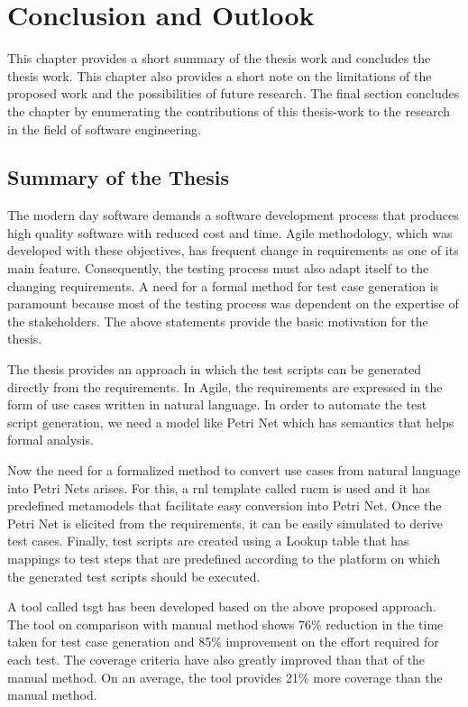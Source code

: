 
\chapter{Conclusion and Outlook}\label{conclusion} 
This chapter provides a short summary of the thesis work and concludes the thesis work. This chapter also provides a short note on the limitations of the proposed work and the possibilities of future research. The final section concludes the chapter by enumerating the contributions of this thesis-work to the research in the field of software engineering.

\section{Summary of the Thesis}
The modern day software demands a software development process that produces high quality software with reduced cost and time.  Agile methodology, which was developed with these objectives, has frequent change in requirements as one of its main feature. Consequently, the testing process must also adapt itself to the changing requirements. A need for a formal method for test case generation is paramount because most of the testing process was dependent on the expertise of the stakeholders. The above statements provide the basic motivation for the thesis.

The thesis provides an approach in which the test scripts can be generated directly from the requirements. In Agile, the requirements are expressed in the form of use cases written in natural language. In order to automate the test script generation, we need a model like Petri Net which has semantics that helps formal analysis. 

Now the need for a formalized method to convert use cases from natural language into Petri Nets arises. For this, a \gls{rnl} template called \gls{rucm} is used and it has predefined metamodels that facilitate easy conversion into Petri Net. Once the Petri Net is elicited from the requirements, it can be easily simulated to derive test cases. Finally, test scripts are created using a Lookup table that has mappings to test steps that are predefined according to the platform on which the generated test scripts should be executed. 

A tool called \gls{tsgt} has been developed based on the above proposed approach. The tool on comparison with manual method shows 76\% reduction in the time taken for test case generation and 85\% improvement on the effort required for each test. The coverage criteria have also greatly improved than that of the manual method. On an average, the tool provides 21\% more coverage than the manual method.

